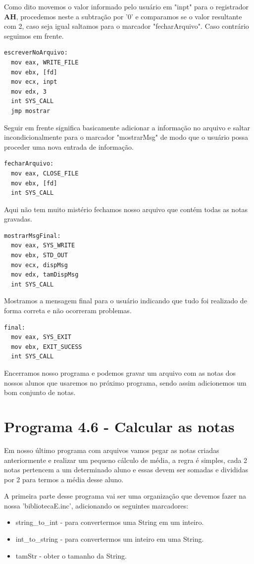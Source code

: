 Como dito movemos o valor informado pelo usuário em "inpt" para o registrador \textbf{AH}, procedemos neste a subtração por '0' e comparamos se o valor resultante com 2, caso seja igual saltamos para o marcador "fecharArquivo". Caso contrário seguimos em frente.
\begin{lstlisting}[]
escreverNoArquivo:
  mov eax, WRITE_FILE
  mov ebx, [fd]
  mov ecx, inpt
  mov edx, 3
  int SYS_CALL
  jmp mostrar	
\end{lstlisting}

Seguir em frente significa basicamente adicionar a informação no arquivo e saltar incondicionalmente para o marcador "mostrarMsg" de modo que o usuário possa proceder uma nova entrada de informação.
\begin{lstlisting}[]
fecharArquivo:
  mov eax, CLOSE_FILE
  mov ebx, [fd]
  int SYS_CALL	
\end{lstlisting}

Aqui não tem muito mistério fechamos nosso arquivo que contém todas as notas gravadas.
\begin{lstlisting}[]
mostrarMsgFinal:
  mov eax, SYS_WRITE
  mov ebx, STD_OUT
  mov ecx, dispMsg
  mov edx, tamDispMsg
  int SYS_CALL	
\end{lstlisting}

Mostramos a mensagem final para o usuário indicando que tudo foi realizado de forma correta e não ocorreram problemas.
\begin{lstlisting}[]
final:
  mov eax, SYS_EXIT
  mov ebx, EXIT_SUCESS
  int SYS_CALL
\end{lstlisting}

Encerramos nosso programa e podemos gravar um arquivo com as notas dos nossos alunos que usaremos no próximo programa, sendo assim adicionemos um bom conjunto de notas.

\section{Programa 4.6 - Calcular as notas}
Em nosso último programa com arquivos vamos pegar as notas criadas anteriormente e realizar um pequeno cálculo de média, a regra é simples, cada 2 notas pertencem a um determinado aluno e essas devem ser somadas e divididas por 2 para termos a média desse aluno.


A primeira parte desse programa vai ser uma organização que devemos fazer na nossa 'bibliotecaE.inc', adicionando os seguintes marcadores:
\begin{itemize}[nolistsep]
	\item string\_to\_int - para convertermos uma String em um inteiro.
	\item int\_to\_string - para convertermos um inteiro em uma String.
	\item tamStr - obter o tamanho da String.
\end{itemize}

